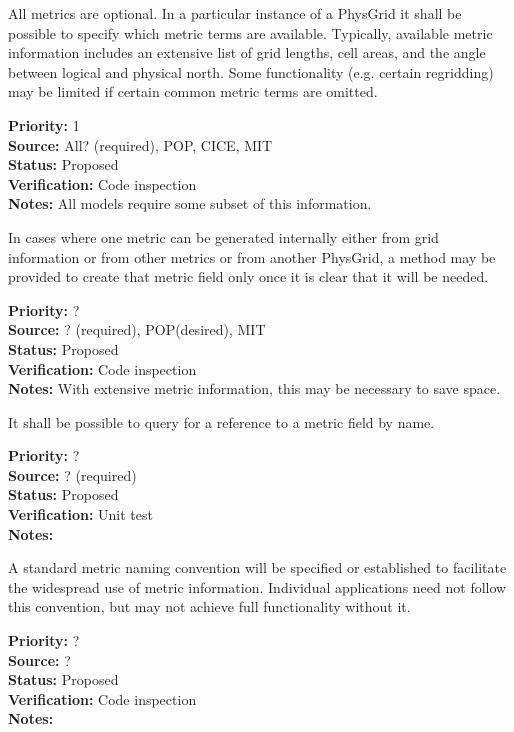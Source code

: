 All metrics are optional.  In a particular instance of a PhysGrid it shall be
possible to specify which metric terms are available.  Typically, available
metric information includes an extensive list of grid lengths, cell areas, and
the angle between logical and physical north.  Some functionality (e.g. certain
regridding) may be limited if certain common metric terms are omitted.
\begin{reqlist}
{\bf Priority:} 1 \\
{\bf Source:} All? (required), POP, CICE, MIT \\
{\bf Status:} Proposed \\
{\bf Verification:} Code inspection \\
{\bf Notes:} All models require some subset of this information.
\end{reqlist}

In cases where one metric can be generated internally either from grid information
or from other metrics or from another PhysGrid, a method may be provided to create
that metric field only once it is clear that it will be needed.
\begin{reqlist}
{\bf Priority:} ? \\
{\bf Source:} ? (required), POP(desired), MIT \\
{\bf Status:} Proposed \\
{\bf Verification:} Code inspection \\
{\bf Notes:} With extensive metric information, this may be necessary to save space.
\end{reqlist}

It shall be possible to query for a reference to a metric field by name.
\begin{reqlist}
{\bf Priority:} ? \\
{\bf Source:} ? (required) \\
{\bf Status:} Proposed \\
{\bf Verification:} Unit test \\
{\bf Notes:} 
\end{reqlist}

A standard metric naming convention will be specified or established to facilitate
the widespread use of metric information.  Individual applications need not
follow this convention, but may not achieve full functionality without it.
\begin{reqlist}
{\bf Priority:} ? \\
{\bf Source:} ? \\
{\bf Status:} Proposed \\
{\bf Verification:} Code inspection \\
{\bf Notes:} 
\end{reqlist}

